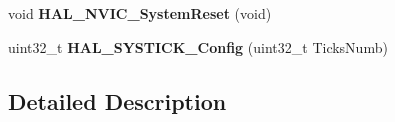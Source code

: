\begin{DoxyCompactItemize}
\item 
\hypertarget{group___c_o_r_t_e_x___exported___functions___group1_gac83d89028fabdf5d4c38ecf4fbfbefdc}{void {\bfseries H\-A\-L\-\_\-\-N\-V\-I\-C\-\_\-\-System\-Reset} (void)}\label{group___c_o_r_t_e_x___exported___functions___group1_gac83d89028fabdf5d4c38ecf4fbfbefdc}

\item 
\hypertarget{group___c_o_r_t_e_x___exported___functions___group1_gac3a3f0d53c315523a8e6e7bcac1940cf}{uint32\-\_\-t {\bfseries H\-A\-L\-\_\-\-S\-Y\-S\-T\-I\-C\-K\-\_\-\-Config} (uint32\-\_\-t Ticks\-Numb)}\label{group___c_o_r_t_e_x___exported___functions___group1_gac3a3f0d53c315523a8e6e7bcac1940cf}

\end{DoxyCompactItemize}


\subsection{Detailed Description}
